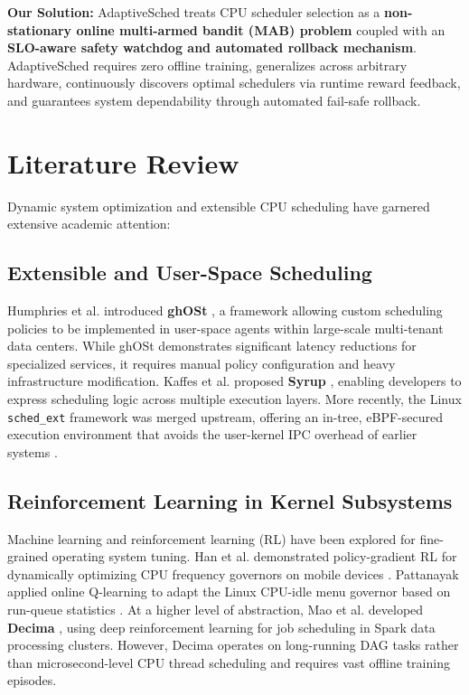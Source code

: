 \documentclass[journal]{IEEEtran}
\begin{document}
\textbf{Our Solution:} AdaptiveSched treats CPU scheduler selection as a \textbf{non-stationary online multi-armed bandit (MAB) problem} coupled with an \textbf{SLO-aware safety watchdog and automated rollback mechanism}. AdaptiveSched requires zero offline training, generalizes across arbitrary hardware, continuously discovers optimal schedulers via runtime reward feedback, and guarantees system dependability through automated fail-safe rollback.

\section{Literature Review}
\label{sec:litreview}

Dynamic system optimization and extensible CPU scheduling have garnered extensive academic attention:

\subsection{Extensible and User-Space Scheduling}
Humphries et al. introduced \textbf{ghOSt} \cite{humphries2021ghost}, a framework allowing custom scheduling policies to be implemented in user-space agents within large-scale multi-tenant data centers. While ghOSt demonstrates significant latency reductions for specialized services, it requires manual policy configuration and heavy infrastructure modification. Kaffes et al. proposed \textbf{Syrup} \cite{kaffes2021syrup}, enabling developers to express scheduling logic across multiple execution layers. More recently, the Linux \texttt{sched\_ext} framework was merged upstream, offering an in-tree, eBPF-secured execution environment that avoids the user-kernel IPC overhead of earlier systems \cite{tang2024optimizing}.

\subsection{Reinforcement Learning in Kernel Subsystems}
Machine learning and reinforcement learning (RL) have been explored for fine-grained operating system tuning. Han et al. demonstrated policy-gradient RL for dynamically optimizing CPU frequency governors on mobile devices \cite{han2020performance}. Pattanayak applied online Q-learning to adapt the Linux CPU-idle menu governor based on run-queue statistics \cite{pattanayak2019linux}. At a higher level of abstraction, Mao et al. developed \textbf{Decima} \cite{mao2019learning}, using deep reinforcement learning for job scheduling in Spark data processing clusters. However, Decima operates on long-running DAG tasks rather than microsecond-level CPU thread scheduling and requires vast offline training episodes.
\end{document}
